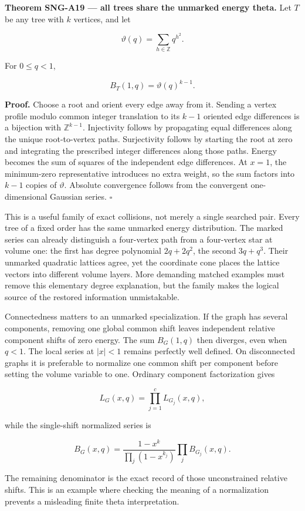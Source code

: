 \documentclass[
  11pt,
  a4paper,
]{report}
\begin{document}
\textbf{Theorem SNG-A19 --- all trees share the unmarked energy theta.}
Let \(T\) be any tree with \(k\) vertices, and let

\[
 \vartheta(q)=\sum_{h\in\mathbb Z}q^{h^2}.
\]

For \(0\le q<1\),

\[
 B_T(1,q)=\vartheta(q)^{k-1}.
 \tag{5.3}
\]

\textbf{Proof.} Choose a root and orient every edge away from it.
Sending a vertex profile modulo common integer translation to its
\(k-1\) oriented edge differences is a bijection with
\(\mathbb Z^{k-1}\). Injectivity follows by propagating equal
differences along the unique root-to-vertex paths. Surjectivity follows
by starting the root at zero and integrating the prescribed integer
differences along those paths. Energy becomes the sum of squares of the
independent edge differences. At \(x=1\), the minimum-zero
representative introduces no extra weight, so the sum factors into
\(k-1\) copies of \(\vartheta\). Absolute convergence follows from the
convergent one-dimensional Gaussian series. \(\square\)

This is a useful family of exact collisions, not merely a single
searched pair. Every tree of a fixed order has the same unmarked energy
distribution. The marked series can already distinguish a four-vertex
path from a four-vertex star at volume one: the first has degree
polynomial \(2q+2q^2\), the second \(3q+q^3\). Their unmarked quadratic
lattices agree, yet the coordinate cone places the lattice vectors into
different volume layers. More demanding matched examples must remove
this elementary degree explanation, but the family makes the logical
source of the restored information unmistakable.

Connectedness matters to an unmarked specialization. If the graph has
several components, removing one global common shift leaves independent
relative component shifts of zero energy. The sum \(B_G(1,q)\) then
diverges, even when \(q<1\). The local series at \(|x|<1\) remains
perfectly well defined. On disconnected graphs it is preferable to
normalize one common shift per component before setting the volume
variable to one. Ordinary component factorization gives

\[
 L_G(x,q)=\prod_{j=1}^cL_{G_j}(x,q),
\]

while the single-shift normalized series is

\[
 B_G(x,q)=
 \frac{1-x^k}{\prod_j(1-x^{k_j})}\prod_jB_{G_j}(x,q).
\]

The remaining denominator is the exact record of those unconstrained
relative shifts. This is an example where checking the meaning of a
normalization prevents a misleading finite theta interpretation.
\end{document}
